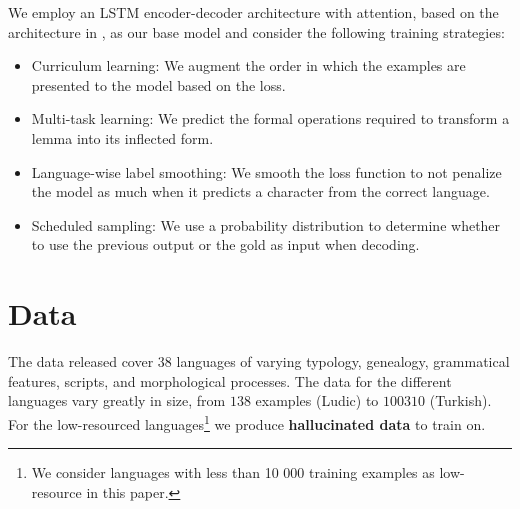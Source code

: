 \documentclass[11pt,a4paper]{article}
\begin{document}


We employ an LSTM encoder-decoder architecture with attention, based on
the architecture in , as our
base model and consider the following training strategies:

\begin{itemize}
\item Curriculum learning: We augment the order in which the examples are presented to the model based on the loss.
\item Multi-task learning: We predict the formal operations required to transform a lemma into its inflected form.
\item Language-wise label smoothing: We smooth the loss function to not penalize the model as much when it predicts a character from the correct language.
\item Scheduled sampling: We use a probability distribution to determine whether to use the previous output or the gold as input when decoding.
\end{itemize}

%


\section{Data}

The data released cover $38$ languages of varying typology, genealogy,
grammatical features, scripts, and morphological processes. The data
for the different languages vary greatly in size, from $138$ examples
(Ludic) to $100310$ (Turkish).  For the low-resourced
languages\footnote{We consider languages with less than 10 000
training examples as low-resource in this paper.} we produce
\textbf{hallucinated data} \cite{DBLP:conf/emnlp/AnastasopoulosN19} to
train on.
\end{document}
